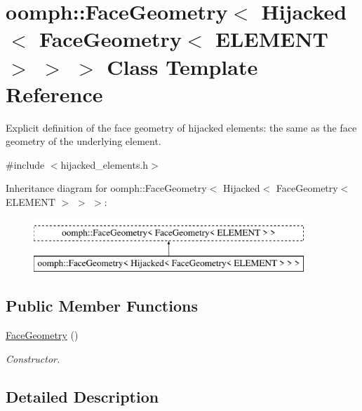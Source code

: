 \hypertarget{classoomph_1_1FaceGeometry_3_01Hijacked_3_01FaceGeometry_3_01ELEMENT_01_4_01_4_01_4}{}\section{oomph\+:\+:Face\+Geometry$<$ Hijacked$<$ Face\+Geometry$<$ E\+L\+E\+M\+E\+NT $>$ $>$ $>$ Class Template Reference}
\label{classoomph_1_1FaceGeometry_3_01Hijacked_3_01FaceGeometry_3_01ELEMENT_01_4_01_4_01_4}


Explicit definition of the face geometry of hijacked elements\+: the same as the face geometry of the underlying element.  




{\ttfamily \#include $<$hijacked\+\_\+elements.\+h$>$}

Inheritance diagram for oomph\+:\+:Face\+Geometry$<$ Hijacked$<$ Face\+Geometry$<$ E\+L\+E\+M\+E\+NT $>$ $>$ $>$\+:\begin{figure}[H]
\begin{center}
\leavevmode
\includegraphics[height=2.000000cm]{classoomph_1_1FaceGeometry_3_01Hijacked_3_01FaceGeometry_3_01ELEMENT_01_4_01_4_01_4}
\end{center}
\end{figure}
\subsection*{Public Member Functions}
\begin{DoxyCompactItemize}
\item 
\hyperlink{classoomph_1_1FaceGeometry_3_01Hijacked_3_01FaceGeometry_3_01ELEMENT_01_4_01_4_01_4_a2acbd5452df461b690cca240f5249647}{Face\+Geometry} ()
\begin{DoxyCompactList}\small\item\em Constructor. \end{DoxyCompactList}\end{DoxyCompactItemize}


\subsection{Detailed Description}
